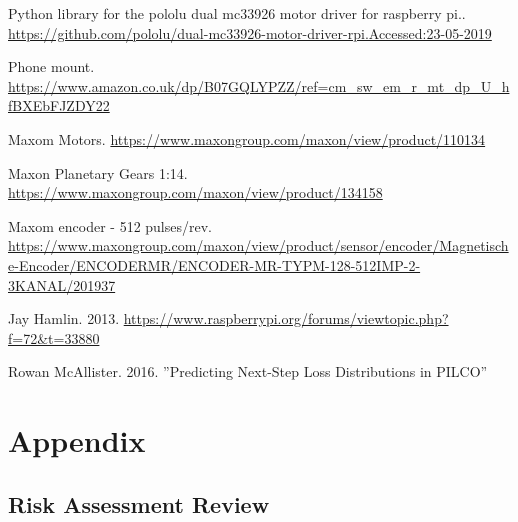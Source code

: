 \documentclass[twoside,twocolumn,12pt]{article}
\begin{document}
\begin{thebibliography}{9}
Python library for the pololu dual mc33926 motor driver for raspberry pi.. \url{https://github.com/pololu/dual-mc33926-motor-driver-rpi.Accessed:23-05-2019}

Phone mount. \url{https://www.amazon.co.uk/dp/B07GQLYPZZ/ref=cm_sw_em_r_mt_dp_U_hfBXEbFJZDY22}

Maxom Motors. \url{https://www.maxongroup.com/maxon/view/product/110134}


Maxon Planetary Gears 1:14. \url{https://www.maxongroup.com/maxon/view/product/134158}

Maxom encoder - 512 pulses/rev. \url{https://www.maxongroup.com/maxon/view/product/sensor/encoder/Magnetische-Encoder/ENCODERMR/ENCODER-MR-TYPM-128-512IMP-2-3KANAL/201937}

Jay Hamlin. 2013. \url{https://www.raspberrypi.org/forums/viewtopic.php?f=72&t=33880}
 
Rowan McAllister. 2016. ''Predicting Next-Step Loss Distributions in PILCO'' 
 
\end{thebibliography}



\clearpage
\section{Appendix}
\subsection{Risk Assessment Review}





\end{document}
